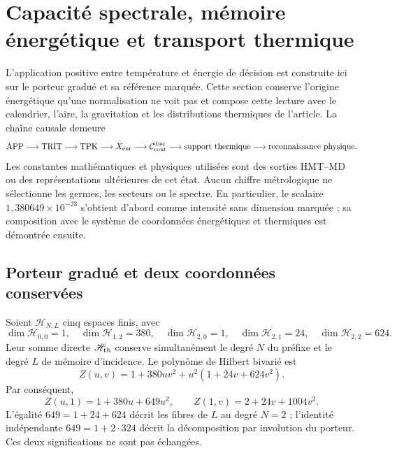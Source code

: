 \section{Capacité spectrale, mémoire énergétique et transport thermique}
\label{v:sec:capacidad-espectral-termica}

L’application positive entre température et énergie de décision est construite
ici sur le porteur gradué et sa référence marquée. Cette section
conserve l’origine
énergétique qu’une normalisation ne voit pas et compose cette lecture avec le calendrier,
l’aire, la gravitation et les distributions thermiques de l’article. La chaîne
causale demeure
\[
 \mathrm{APP}\longrightarrow\mathrm{TRIT}\longrightarrow\mathrm{TPK}
 \longrightarrow X_{\rm enr}
 \longrightarrow\mathcal C_{\rm cont}^{\rm disc}
 \longrightarrow\text{support thermique}
 \longrightarrow\text{reconnaissance physique}.
\]
Les constantes mathématiques et physiques utilisées sont des sorties HMT--MD ou
des représentations ultérieures de cet état. Aucun chiffre métrologique ne sélectionne
les germes, les secteurs ou le spectre. En particulier, le scalaire
$1{,}380649\times10^{-23}$ s’obtient d’abord comme intensité sans dimension
marquée ; sa composition avec le système de coordonnées énergétiques et thermiques est démontrée
ensuite.

\subsection{Porteur gradué et deux coordonnées conservées}

Soient $\mathscr H_{N,L}$ cinq espaces finis, avec
\begin{equation}
 \dim\mathscr H_{0,0}=1,\quad
 \dim\mathscr H_{1,2}=380,\quad
 \dim\mathscr H_{2,0}=1,\quad
 \dim\mathscr H_{2,1}=24,\quad
 \dim\mathscr H_{2,2}=624.
 \label{v:eq:fibras-termicas-NL}
\end{equation}
Leur somme directe $\mathscr H_{\rm th}$ conserve simultanément le degré
$N$ du préfixe et le degré $L$ de mémoire d’incidence. Le polynôme de
Hilbert bivarié est
\begin{equation}
 Z(u,v)=1+380uv^2+u^2(1+24v+624v^2).
 \label{v:eq:polinomio-graduado-termico}
\end{equation}
Par conséquent,
\[
 Z(u,1)=1+380u+649u^2,\qquad
 Z(1,v)=2+24v+1004v^2.
\]
L’égalité $649=1+24+624$ décrit les fibres de $L$ au degré $N=2$ ;
l’identité indépendante $649=1+2\cdot324$ décrit la décomposition
par involution du porteur. Ces deux significations ne sont pas échangées.


